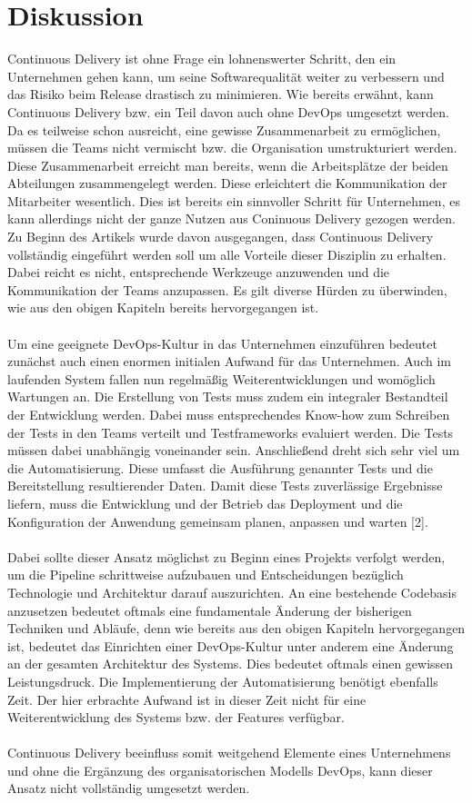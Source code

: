 \section{Diskussion}
Continuous Delivery ist ohne Frage ein lohnenswerter Schritt, den ein Unternehmen gehen kann, um seine Softwarequalität weiter zu verbessern und das Risiko beim Release drastisch zu minimieren. Wie bereits erwähnt, kann Continuous Delivery bzw. ein Teil davon auch ohne DevOps umgesetzt werden. Da es teilweise schon ausreicht, eine gewisse Zusammenarbeit zu ermöglichen, müssen die Teams nicht vermischt bzw. die Organisation umstrukturiert werden. Diese Zusammenarbeit erreicht man bereits, wenn die Arbeitsplätze der beiden Abteilungen zusammengelegt werden. Diese erleichtert die Kommunikation der Mitarbeiter wesentlich. Dies ist bereits ein sinnvoller Schritt für Unternehmen, es kann allerdings nicht der ganze Nutzen aus Coninuous Delivery gezogen werden. Zu Beginn des Artikels wurde davon ausgegangen, dass Continuous Delivery vollständig eingeführt werden soll um alle Vorteile dieser Disziplin zu erhalten. Dabei reicht es nicht, entsprechende Werkzeuge anzuwenden und die Kommunikation der Teams anzupassen. Es gilt diverse Hürden zu überwinden, wie aus den obigen Kapiteln bereits hervorgegangen ist. \\ \\
Um eine geeignete DevOps-Kultur in das Unternehmen einzuführen bedeutet zunächst auch einen enormen initialen Aufwand für das Unternehmen. Auch im laufenden System fallen nun regelmäßig Weiterentwicklungen und womöglich Wartungen an. Die Erstellung von Tests muss zudem ein integraler Bestandteil der Entwicklung werden. Dabei muss entsprechendes Know-how zum Schreiben der Tests in den Teams verteilt und Testframeworks evaluiert werden. Die Tests müssen dabei unabhängig voneinander sein. Anschließend dreht sich sehr viel um die Automatisierung. Diese umfasst die Ausführung genannter Tests und die Bereitstellung resultierender Daten. Damit diese Tests zuverlässige Ergebnisse liefern, muss die Entwicklung und der Betrieb das Deployment und die Konfiguration der Anwendung gemeinsam planen, anpassen und warten [2].\\ \\
Dabei sollte dieser Ansatz möglichst zu Beginn eines Projekts verfolgt werden, um die Pipeline schrittweise aufzubauen und Entscheidungen bezüglich Technologie und Architektur darauf auszurichten. An eine bestehende Codebasis anzusetzen bedeutet oftmals eine fundamentale Änderung der bisherigen Techniken und Abläufe, denn wie bereits aus den obigen Kapiteln hervorgegangen ist, bedeutet das Einrichten einer DevOps-Kultur unter anderem eine Änderung an der gesamten Architektur des Systems. Dies bedeutet oftmals einen gewissen Leistungsdruck. Die Implementierung der Automatisierung benötigt ebenfalls Zeit. Der hier erbrachte Aufwand ist in dieser Zeit nicht für eine Weiterentwicklung des Systems bzw. der Features verfügbar.\\ \\
Continuous Delivery beeinfluss somit weitgehend Elemente eines Unternehmens und ohne die Ergänzung des organisatorischen Modells DevOps, kann dieser Ansatz nicht vollständig umgesetzt werden.


\ifCLASSOPTIONcaptionsoff
  \newpage
\fi